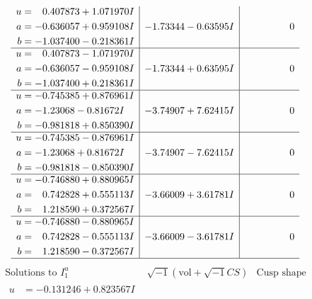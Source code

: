 \documentclass[1p]{elsarticle_modified}
\theoremstyle{definition}
\newcommand{\I}{\sqrt{-1}}
\begin{document}
$$\begin{array}{c|c|c}
\begin{aligned}
u &= \phantom{-}0.407873 + 1.071970 I \\
a &= -0.636057 + 0.959108 I \\
b &= -1.037400 - 0.218361 I\end{aligned}
 & -1.73344 - 0.63595 I & \phantom{-0.000000 } 0 \\ \hline\begin{aligned}
u &= \phantom{-}0.407873 - 1.071970 I \\
a &= -0.636057 - 0.959108 I \\
b &= -1.037400 + 0.218361 I\end{aligned}
 & -1.73344 + 0.63595 I & \phantom{-0.000000 } 0 \\ \hline\begin{aligned}
u &= -0.745385 + 0.876961 I \\
a &= -1.23068 - 0.81672 I \\
b &= -0.981818 + 0.850390 I\end{aligned}
 & -3.74907 + 7.62415 I & \phantom{-0.000000 } 0 \\ \hline\begin{aligned}
u &= -0.745385 - 0.876961 I \\
a &= -1.23068 + 0.81672 I \\
b &= -0.981818 - 0.850390 I\end{aligned}
 & -3.74907 - 7.62415 I & \phantom{-0.000000 } 0 \\ \hline\begin{aligned}
u &= -0.746880 + 0.880965 I \\
a &= \phantom{-}0.742828 + 0.555113 I \\
b &= \phantom{-}1.218590 + 0.372567 I\end{aligned}
 & -3.66009 + 3.61781 I & \phantom{-0.000000 } 0 \\ \hline\begin{aligned}
u &= -0.746880 - 0.880965 I \\
a &= \phantom{-}0.742828 - 0.555113 I \\
b &= \phantom{-}1.218590 - 0.372567 I\end{aligned}
 & -3.66009 - 3.61781 I & \phantom{-0.000000 } 0\\
 \hline 
 \end{array}$$\newpage$$\begin{array}{c|c|c}  
\text{Solutions to }I^u_{1}& \I (\text{vol} + \sqrt{-1}CS) & \text{Cusp shape}\\
 \hline 
\begin{aligned}
u &= -0.131246 + 0.823567 I \\

\end{aligned}
\end{array}$$
\end{document}
